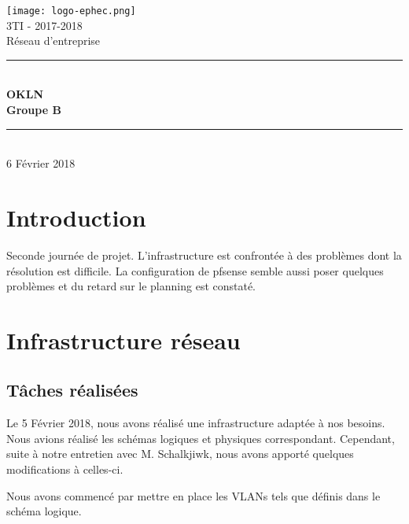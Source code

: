 \documentclass{article}
\begin{document}
\begin{titlepage}
\begin{center}

\texttt{[image: logo-ephec.png]}\\[1cm]
{\large 3TI - 2017-2018}\\[0.5cm]

{\large Réseau d'entreprise}\\[0.8cm]
\newcommand{\HRule}{\rule{\linewidth}{0.5mm}}
\HRule \\[0.7cm]
{\huge \bfseries OKLN\\[0.75cm] }
{\bfseries Groupe B }\\[1cm]
\HRule \\[2.5cm]


6 Février 2018

\end{center}
\end{titlepage}


\section{Introduction}
Seconde journée de projet. L'infrastructure est confrontée à des problèmes dont la résolution est difficile. La configuration de pfsense semble aussi poser quelques problèmes et du retard sur le planning est constaté.

\section{Infrastructure réseau}
    \subsection{Tâches réalisées}
        Le 5 Février 2018, nous avons réalisé une infrastructure adaptée à nos besoins. Nous avions réalisé les schémas logiques et physiques correspondant. Cependant, suite à notre entretien avec M. Schalkjiwk, nous avons apporté quelques modifications à celles-ci.
        
        Nous avons commencé par mettre en place les VLANs tels que définis dans le schéma logique.
        
\end{document}
